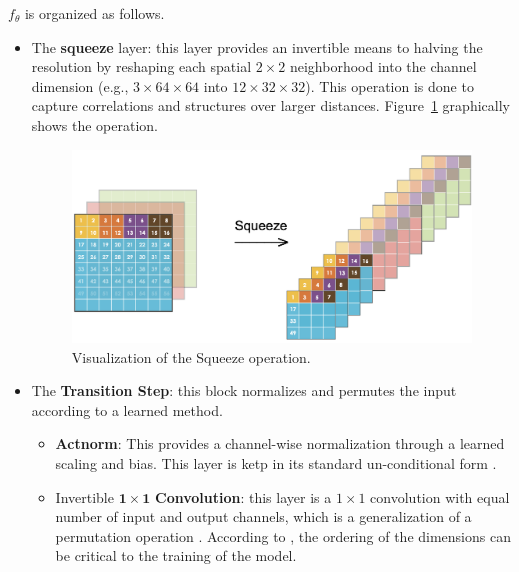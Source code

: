 \documentclass{article}
\begin{document}
$f_\theta$ is organized as follows.
\begin{itemize}
    \item The \textbf{squeeze} layer: this layer provides an invertible means to halving the resolution by reshaping each spatial $2 \times 2$ neighborhood into the channel dimension (e.g., $3\times 64 \times 64$ into $12 \times 32 \times 32$). This operation is done to capture correlations and structures over larger distances. Figure~\ref{img:squeeze} graphically shows the operation.
    
    \begin{figure}[h]
        \centering
        \includegraphics[scale=.3]{squeeze}
        \caption{Visualization of the Squeeze operation.}
        \label{img:squeeze}
    \end{figure}

    \item The \textbf{Transition Step}: this block normalizes and permutes the input according to a learned method.
        \begin{itemize}
            \item \textbf{Actnorm}: This provides a channel-wise normalization through a learned scaling and bias. This layer is ketp in its standard un-conditional form \cite{1x1}.

            \item Invertible $\boldsymbol{1 \times 1}$ \textbf{Convolution}:  this layer is a $1 \times 1$ convolution with equal number of input and output channels, which is a generalization of a permutation operation \cite{1x1}. According to \cite{order}, the ordering of the dimensions can be critical to the training of the model.
        \end{itemize}


\end{itemize}
\end{document}
